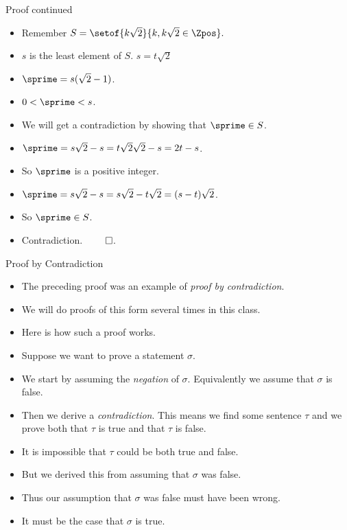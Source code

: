 \documentclass[handout]{beamer}
\begin{document}
\begin{frame}{Proof continued}

\begin{itemize}
  \item Remember $S=\setof{k\sqrt{2}}{k,k\sqrt{2}\in\Zpos}.$
  \item $s$ is the least element of $S$. $s=t\sqrt{2}$
  \item $\sprime = s(\sqrt{2} - 1)$.
  \item $0< \sprime<s$.
  \item We will get a contradiction by showing that $\sprime\in S$.
  \item $\sprime = s\sqrt{2} -s = t\sqrt{2}\sqrt{2} - s = 2t -s$.
  \item So $\sprime$ is a  positive integer.
  \item $\sprime = s\sqrt{2} -s = s\sqrt{2} - t\sqrt{2} = (s-t)\sqrt{2}$.
  \item So $\sprime\in S$.
  \item Contradiction. $\qed$.
\end{itemize}

\end{frame}

\begin{frame}{Proof by Contradiction}
\begin{itemize}
\item The preceding proof was an example of \emph{proof by contradiction}.
\item We will do proofs of this form several times in this class.
\item Here is how such a proof works.
\item Suppose we want to prove a statement $\sigma$.
\item We start by assuming the \emph{negation} of $\sigma$. Equivalently we assume
that $\sigma$ is false.
\item Then we derive a \emph{contradiction}. This means we find some sentence $\tau$
and we prove both that $\tau$ is true and that $\tau$ is false.
\item It is impossible that $\tau$ could be both true and false.
\item But we derived this from assuming that $\sigma$ was false.
\item Thus our assumption that $\sigma$ was false must have been wrong.
\item It must be the case that $\sigma$ is true.
\end{itemize}
\end{frame}
\end{document}

